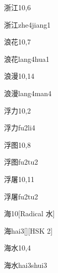 \begin{entry}{浙江}{10,6}
  \begin{phonetics}{浙江}{zhe4jiang1}
  \end{phonetics}
\end{entry}

\begin{entry}{浪花}{10,7}
  \begin{phonetics}{浪花}{lang4hua1}
  \end{phonetics}
\end{entry}

\begin{entry}{浪漫}{10,14}
  \begin{phonetics}{浪漫}{lang4man4}
  \end{phonetics}
\end{entry}

\begin{entry}{浮力}{10,2}
  \begin{phonetics}{浮力}{fu2li4}
  \end{phonetics}
\end{entry}

\begin{entry}{浮图}{10,8}
  \begin{phonetics}{浮图}{fu2tu2}
  \end{phonetics}
\end{entry}

\begin{entry}{浮屠}{10,11}
  \begin{phonetics}{浮屠}{fu2tu2}
  \end{phonetics}
\end{entry}

\begin{entry}{海}{10}[Radical 水]
  \begin{phonetics}{海}{hai3}[][HSK 2]
  \end{phonetics}
\end{entry}

\begin{entry}{海水}{10,4}
  \begin{phonetics}{海水}{hai3shui3}
  \end{phonetics}
\end{entry}

